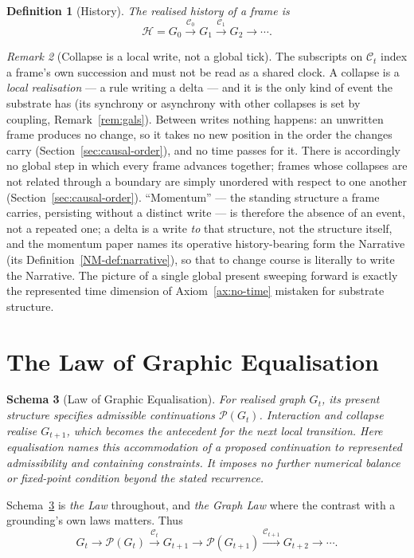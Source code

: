 \documentclass[11pt,a4paper]{article}
\newtheorem{definition}{Definition}[section]
\newtheorem{schema}[definition]{Schema}
\theoremstyle{remark}\newtheorem{remark}[definition]{Remark}
\newcommand{\Poss}{\mathcal{P}}
\newcommand{\Coll}{\mathcal{C}}
\newcommand{\Hist}{\mathcal{H}}
\begin{document}
\begin{definition}[History]\label{def:history}
The realised history of a frame is
\[\Hist=G_0\xrightarrow{\Coll_0}G_1\xrightarrow{\Coll_1}G_2\rightarrow\cdots.\]
\end{definition}

\begin{remark}[Collapse is a local write, not a global tick]\label{rem:collapse-write}
The subscripts on $\Coll_t$ index a frame's own succession and must not be read as a shared clock. A collapse is a \emph{local realisation} --- a rule writing a delta --- and it is the only kind of event the substrate has (its synchrony or asynchrony with other collapses is set by coupling, Remark~\ref{rem:gals}). Between writes nothing happens: an unwritten frame produces no change, so it takes no new position in the order the changes carry (Section~\ref{sec:causal-order}), and no time passes for it. There is accordingly no global step in which every frame advances together; frames whose collapses are not related through a boundary are simply unordered with respect to one another (Section~\ref{sec:causal-order}). ``Momentum'' --- the standing structure a frame carries, persisting without a distinct write --- is therefore the absence of an event, not a repeated one; a delta is a write \emph{to} that structure, not the structure itself, and the momentum paper names its operative history-bearing form the Narrative (its Definition~\ref{NM-def:narrative}), so that to change course is literally to write the Narrative. The picture of a single global present sweeping forward is exactly the represented time dimension of Axiom~\ref{ax:no-time} mistaken for substrate structure.
\end{remark}

\section{The Law of Graphic Equalisation}\label{sec:the-law}
\begin{schema}[Law of Graphic Equalisation]\label{hyp:the-law}
For realised graph $G_t$, its present structure specifies admissible
continuations $\Poss(G_t)$. Interaction and collapse realise $G_{t+1}$,
which becomes the antecedent for the next local transition. Here
\emph{equalisation} names this accommodation of a proposed continuation to
represented admissibility and containing constraints. It imposes no further
numerical balance or fixed-point condition beyond the stated recurrence.
\end{schema}
Schema~\ref{hyp:the-law} is \emph{the Law} throughout, and \emph{the Graph Law} where the contrast
with a grounding's own laws matters. Thus
\[\boxed{G_t\rightarrow\Poss(G_t)\xrightarrow{\Coll_t}G_{t+1}\rightarrow\Poss(G_{t+1})\xrightarrow{\Coll_{t+1}}G_{t+2}\rightarrow\cdots.}\]
\end{document}
